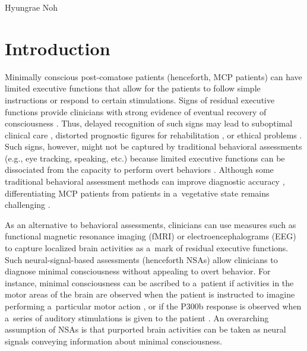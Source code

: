 \begin{artengenv}{Hyungrae Noh}
\section{Introduction}
Minimally conscious post-comatose patients (henceforth, MCP patients) can have limited executive functions that allow for the patients to follow simple instructions or respond to certain stimulations. Signs of residual executive functions provide clinicians with strong evidence of eventual recovery of consciousness
\parencites[][]{naccache_minimally_2018}[][]{rohaut_uncovering_2019}. %
 Thus, delayed recognition of such signs may lead to suboptimal clinical care 
\parencite[van][]{van_erp_unexpected_2019}, %
 distorted prognostic figures for rehabilitation 
\parencite[][]{ansell_slow--recover_1993}, %
 or ethical problems 
\parencites[][]{peterson_post-comatose_2018}[][]{noh_behavioral_2022}. %
 Such signs, however, might not be captured by traditional behavioral assessments (e.g., eye tracking, speaking, etc.) because limited executive functions can be dissociated from the capacity to perform overt behaviors 
\parencites[][]{teasdale_assessment_1974}[][]{andrews_misdiagnosis_1996}. %
 Although some traditional behavioral assessment methods can improve diagnostic accuracy 
\parencite[][]{schnakers_diagnostic_2009}, %
 differentiating MCP patients from patients in a~vegetative state remains challenging 
\parencite[van][]{van_erp_vegetative_2015}.%


As an alternative to behavioral assessments, clinicians can use measures such as functional magnetic resonance imaging (fMRI) or electroencephalograms (EEG) to capture localized brain activities as a~mark of residual executive functions. Such neural-signal-based assessments (henceforth NSAs) allow clinicians to diagnose minimal consciousness without appealing to overt behavior. For instance, minimal consciousness can be ascribed to a~patient if activities in the motor areas of the brain are observed when the patient is instructed to imagine performing a~particular motor action
\parencites[][]{owen_detecting_2006}[][]{cruse_bedside_2011}[][]{wang_detecting_2019}, %
 or if the P300b response is observed when a~series of auditory stimulations is given to the patient 
\parencites[][]{boly_preserved_2011}[][]{king_single-trial_2013}. %
 An overarching assumption of NSAs is that purported brain activities can be taken as neural signals conveying information about minimal consciousness.


\end{artengenv}
